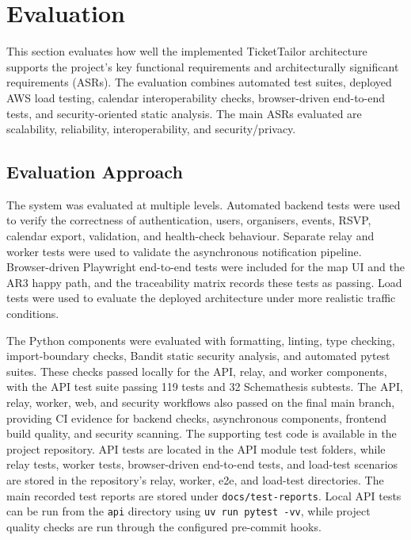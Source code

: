 
\section{Evaluation}
\label{sec:evaluation}

This section evaluates how well the implemented TicketTailor architecture supports the project's key functional requirements and architecturally significant requirements (ASRs). The evaluation combines automated test suites, deployed AWS load testing, calendar interoperability checks, browser-driven end-to-end tests, and security-oriented static analysis. The main ASRs evaluated are scalability, reliability, interoperability, and security/privacy.

\subsection{Evaluation Approach}

The system was evaluated at multiple levels. Automated backend tests were used to verify the correctness of authentication, users, organisers, events, RSVP, calendar export, validation, and health-check behaviour. Separate relay and worker tests were used to validate the asynchronous notification pipeline. Browser-driven Playwright end-to-end tests were included for the map UI and the AR3 happy path, and the traceability matrix records these tests as passing. Load tests were used to evaluate the deployed architecture under more realistic traffic conditions.

The Python components were evaluated with formatting, linting, type checking, import-boundary checks, Bandit static security analysis, and automated pytest suites. These checks passed locally for the API, relay, and worker components, with the API test suite passing 119 tests and 32 Schemathesis subtests. The API, relay, worker, web, and security workflows also passed on the final main branch, providing CI evidence for backend checks, asynchronous components, frontend build quality, and security scanning. The supporting test code is available in the project repository. API tests are located in the API module test folders, while relay tests, worker tests, browser-driven end-to-end tests, and load-test scenarios are stored in the repository's relay, worker, e2e, and load-test directories. The main recorded test reports are stored under \texttt{docs/test-reports}. Local API tests can be run from the \texttt{api} directory using \texttt{uv run pytest -vv}, while project quality checks are run through the configured pre-commit hooks.

